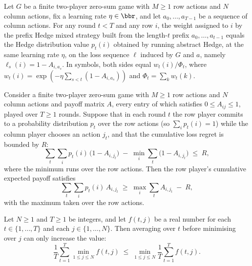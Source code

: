 \begin{lemma}
\label{prefixHedgeMixedStrategy_weight_eq_hedgeDist}
\leanok
{}
Let $G$ be a finite two-player zero-sum game with $M \ge 1$ row actions and $N$ column
actions, fix a learning rate $\eta \in \bbr$, and let $a_0, \dots, a_{T-1}$ be a
sequence of column actions. For any round $t < T$ and any row $i$, the weight assigned
to $i$ by the prefix Hedge mixed strategy built from the length-$t$ prefix $a_0, \dots,
a_{t-1}$ equals the Hedge distribution value $p_t(i)$ obtained by running abstract
Hedge, at the same learning rate $\eta$, on the loss sequence $\ell$ induced by $G$ and
$a$, namely $\ell_s(i) = 1 - A_{i, a_s}$. In symbols, both sides equal $w_t(i)/\Phi_t$,
where $w_t(i) = \exp(-\eta \sum_{s<t}(1 - A_{i,a_s}))$ and $\Phi_t = \sum_{k} w_t(k)$.
\end{lemma}

\begin{lemma}
\label{regret_to_payoff}
\leanok
{}
Consider a finite two-player zero-sum game with $M \ge 1$ row actions and $N$ column
actions and payoff matrix $A$, every entry of which satisfies $0 \le A_{ij} \le 1$,
played over $T \ge 1$ rounds. Suppose that in each round $t$ the row player commits to a
probability distribution $p_t$ over the row actions (so $\sum_i p_t(i) = 1$) while the
column player chooses an action $j_t$, and that the cumulative loss regret is bounded by
$R$:
\[
  \sum_t \sum_i p_t(i)\,\bigl(1 - A_{i,j_t}\bigr)
  \;-\; \min_i \sum_t \bigl(1 - A_{i,j_t}\bigr) \;\le\; R,
\]
where the minimum runs over the row actions. Then the row player's cumulative expected
payoff satisfies
\[
  \sum_t \sum_i p_t(i)\,A_{i,j_t}
  \;\ge\;
  \max_i \sum_t A_{i,j_t} \;-\; R,
\]
with the maximum taken over the row actions.
\end{lemma}

\begin{lemma}
\label{avg_min_le_min_avg}
\leanok
{}
Let $N \ge 1$ and $T \ge 1$ be integers, and let $f(t,j)$ be a real number for each $t
\in \{1,\dots,T\}$ and each $j \in \{1,\dots,N\}$. Then averaging over $t$ before
minimising over $j$ can only increase the value:
\[
  \frac{1}{T} \sum_{t=1}^{T} \min_{1 \le j \le N} f(t,j)
  \;\le\;
  \min_{1 \le j \le N} \frac{1}{T} \sum_{t=1}^{T} f(t,j).
\]
\end{lemma}

